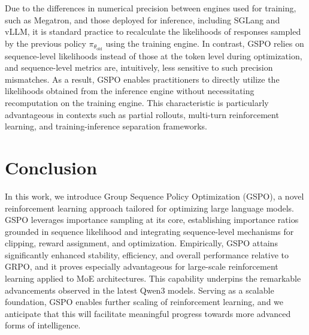 Due to the differences in numerical precision between engines used for training, such as Megatron, and those deployed for inference, including SGLang and vLLM, it is standard practice to recalculate the likelihoods of responses sampled by the previous policy $\pi_{\theta_\text{old}}$ using the training engine. In contrast, GSPO relies on sequence-level likelihoods instead of those at the token level during optimization, and sequence-level metrics are, intuitively, less sensitive to such precision mismatches. As a result, GSPO enables practitioners to directly utilize the likelihoods obtained from the inference engine without necessitating recomputation on the training engine. This characteristic is particularly advantageous in contexts such as partial rollouts, multi-turn reinforcement learning, and training-inference separation frameworks.

\section{Conclusion}

In this work, we introduce Group Sequence Policy Optimization (GSPO), a novel reinforcement learning approach tailored for optimizing large language models. GSPO leverages importance sampling at its core, establishing importance ratios grounded in sequence likelihood and integrating sequence-level mechanisms for clipping, reward assignment, and optimization. Empirically, GSPO attains significantly enhanced stability, efficiency, and overall performance relative to GRPO, and it proves especially advantageous for large-scale reinforcement learning applied to MoE architectures. This capability underpins the remarkable advancements observed in the latest Qwen3 models. Serving as a scalable foundation, GSPO enables further scaling of reinforcement learning, and we anticipate that this will facilitate meaningful progress towards more advanced forms of intelligence.


